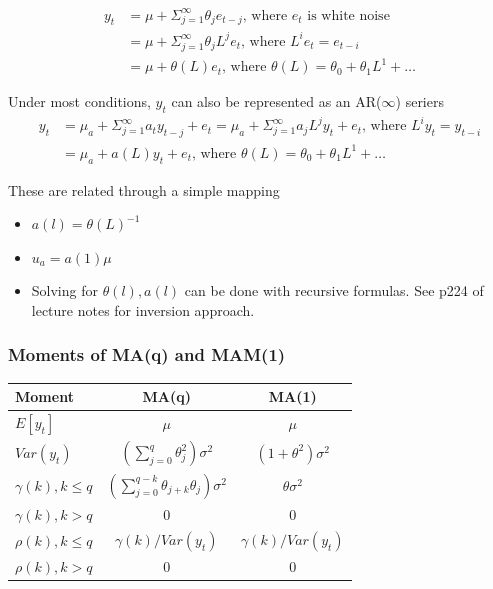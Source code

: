 \documentclass{article}
\begin{document}
\begin{align*}
  y_t &= \mu + \Sigma_{j=1}^\infty \theta_je_{t-j} \textrm{, where $e_t$ is white noise}\\
  &= \mu + \Sigma_{j=1}^\infty \theta_jL^je_t \textrm{, where } L^ie_t = e_{t-i}\\
  &= \mu + \theta(L)e_t \textrm{, where } \theta(L) = \theta_0 + \theta_1L^1 + \dots
\end{align*}

Under most conditions, $y_t$ can also be represented as an AR($\infty$) seriers
\begin{align*}
  y_t &= \mu_a + \Sigma_{j=1}^\infty a_ty_{t-j} + e_t = \mu_a + \Sigma_{j=1}^\infty a_jL^jy_t + e_t \textrm{, where } L^iy_t = y_{t-i}\\
  &= \mu_a + a(L)y_t + e_t \textrm{, where } \theta(L) = \theta_0 + \theta_1L^1 + \dots
\end{align*}

These are related through a simple mapping
\begin{itemize}
  \item $a(l) = \theta(L)^{-1}$
  \item $u_a = a(1)\mu$
  \item Solving for $\theta(l), a(l)$ can be done with recursive formulas. See p224 of lecture notes for inversion approach.
\end{itemize}

\subsubsection{Moments of MA(q) and MAM(1)}
\begin{table}[h]
  \begin{center}
  \begin{tabular}{lcc}
       \textbf{Moment} & \textbf{MA(q)} & \textbf{MA(1)} \\
       \midrule
      $E[y_t]$ & $\mu$ & $\mu$ \\
      $Var(y_t)$ & $\left(\sum_{j=0}^q \theta^2_j \right)\sigma^2$& $(1 + \theta^2)\sigma^2$\\
      $\gamma(k), k \leq q$ & $\left(\sum_{j=0}^{q-k} \theta_{j+k}\theta_j \right)\sigma^2$& $\theta\sigma^2$ \\
      $\gamma(k), k > q$ & 0 & 0 \\
      $\rho(k), k \leq q$ & $\gamma(k)/Var(y_t)$ & $\gamma(k)/Var(y_t)$\\
      $\rho(k), k > q$ & 0& 0\\
      \bottomrule
  \end{tabular}
  \end{center}
\end{table}
\end{document}
